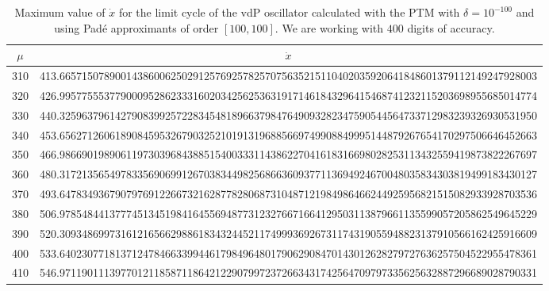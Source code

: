 \documentclass[final]{article}
\begin{document}
\begin{table}
\caption{Maximum value of $\dot{x}$ for the limit cycle of the vdP oscillator calculated with the PTM with $\delta=10^{-100}$ and using Pad\'e approximants of order $[100,100]$. We are working with $400$ digits of accuracy. }
\bigskip
\label{table_vmax_vdP3}
\begin{center}
\begin{tabular}{|c|c|}
\hline
$\mu$ &   $\dot{x}$    \\
\hline
310 &   413.66571507890014386006250291257692578257075635215110402035920641848601379112149247928003%
\\
320 &   426.99577555377900095286233316020342562536319171461843296415468741232115203698955685014774%
\\
330 &   440.32596379614279083992572283454818966379847649093282347590544564733712983239326930531950%
\\
340 &   453.65627126061890845953267903252101913196885669749908849995144879267654170297506646452663%
\\
350 &   466.98669019890611973039684388515400333114386227041618316698028253113432559419873822267697%
\\
360 &   480.31721356549783356906991267038344982568663609377113694924670048035834303819499183430127%
\\
370 &   493.64783493679079769122667321628778280687310487121984986466244925956821515082933928703536%
\\
380 &   506.97854844137774513451984164556948773123276671664129503113879661135599057205862549645229%
\\
390 &   520.30934869973161216566298861834324452117499936926731174319055948823137910566162425916609%
\\
400 &   533.64023077181371247846633994461798496480179062908470143012628279727636257504522955478361%
\\
410 &   546.97119011139770121185871186421229079972372663431742564709797335625632887296689028790331%

\end{tabular}
\end{center}
\end{table}
\end{document}
